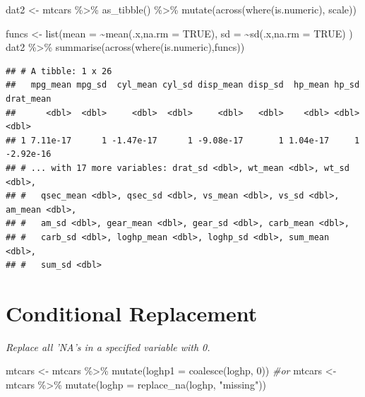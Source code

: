 \documentclass[
]{book}
\newenvironment{Shaded}{\begin{snugshade}}{\end{snugshade}}
\newcommand{\AttributeTok}[1]{\textcolor[rgb]{0.77,0.63,0.00}{#1}}
\newcommand{\CommentTok}[1]{\textcolor[rgb]{0.56,0.35,0.01}{\textit{#1}}}
\newcommand{\ConstantTok}[1]{\textcolor[rgb]{0.00,0.00,0.00}{#1}}
\newcommand{\DecValTok}[1]{\textcolor[rgb]{0.00,0.00,0.81}{#1}}
\newcommand{\FunctionTok}[1]{\textcolor[rgb]{0.00,0.00,0.00}{#1}}
\newcommand{\NormalTok}[1]{#1}
\newcommand{\OtherTok}[1]{\textcolor[rgb]{0.56,0.35,0.01}{#1}}
\newcommand{\SpecialCharTok}[1]{\textcolor[rgb]{0.00,0.00,0.00}{#1}}
\newcommand{\StringTok}[1]{\textcolor[rgb]{0.31,0.60,0.02}{#1}}
\begin{document}
\begin{Shaded}
\begin{Highlighting}[]
\NormalTok{dat2 }\OtherTok{\textless{}{-}}\NormalTok{ mtcars }\SpecialCharTok{\%\textgreater{}\%}
    \FunctionTok{as\_tibble}\NormalTok{() }\SpecialCharTok{\%\textgreater{}\%}
    \FunctionTok{mutate}\NormalTok{(}\FunctionTok{across}\NormalTok{(}\FunctionTok{where}\NormalTok{(is.numeric), scale))}

\NormalTok{funcs }\OtherTok{\textless{}{-}} \FunctionTok{list}\NormalTok{(}\AttributeTok{mean =} \SpecialCharTok{\textasciitilde{}}\FunctionTok{mean}\NormalTok{(.x,}\AttributeTok{na.rm =} \ConstantTok{TRUE}\NormalTok{), }
  \AttributeTok{sd =} \SpecialCharTok{\textasciitilde{}}\FunctionTok{sd}\NormalTok{(.x,}\AttributeTok{na.rm =} \ConstantTok{TRUE}\NormalTok{)}
\NormalTok{)}
\NormalTok{dat2 }\SpecialCharTok{\%\textgreater{}\%} \FunctionTok{summarise}\NormalTok{(}\FunctionTok{across}\NormalTok{(}\FunctionTok{where}\NormalTok{(is.numeric),funcs))}
\end{Highlighting}
\end{Shaded}

\begin{verbatim}
## # A tibble: 1 x 26
##   mpg_mean mpg_sd  cyl_mean cyl_sd disp_mean disp_sd  hp_mean hp_sd drat_mean
##      <dbl>  <dbl>     <dbl>  <dbl>     <dbl>   <dbl>    <dbl> <dbl>     <dbl>
## 1 7.11e-17      1 -1.47e-17      1 -9.08e-17       1 1.04e-17     1 -2.92e-16
## # ... with 17 more variables: drat_sd <dbl>, wt_mean <dbl>, wt_sd <dbl>,
## #   qsec_mean <dbl>, qsec_sd <dbl>, vs_mean <dbl>, vs_sd <dbl>, am_mean <dbl>,
## #   am_sd <dbl>, gear_mean <dbl>, gear_sd <dbl>, carb_mean <dbl>,
## #   carb_sd <dbl>, loghp_mean <dbl>, loghp_sd <dbl>, sum_mean <dbl>,
## #   sum_sd <dbl>
\end{verbatim}

\hypertarget{conditional-replacement}{%
\section{Conditional Replacement}\label{conditional-replacement}}

\emph{Replace all 'NA's in a specified variable with 0.}

\begin{Shaded}
\begin{Highlighting}[]
\NormalTok{mtcars }\OtherTok{\textless{}{-}}\NormalTok{ mtcars }\SpecialCharTok{\%\textgreater{}\%} \FunctionTok{mutate}\NormalTok{(}\AttributeTok{loghp1 =} \FunctionTok{coalesce}\NormalTok{(loghp, }\DecValTok{0}\NormalTok{))}
\CommentTok{\#or}
\NormalTok{mtcars }\OtherTok{\textless{}{-}}\NormalTok{ mtcars }\SpecialCharTok{\%\textgreater{}\%} \FunctionTok{mutate}\NormalTok{(}\AttributeTok{loghp =} \FunctionTok{replace\_na}\NormalTok{(loghp, }\StringTok{"missing"}\NormalTok{))}
\end{Highlighting}
\end{Shaded}
\end{document}
